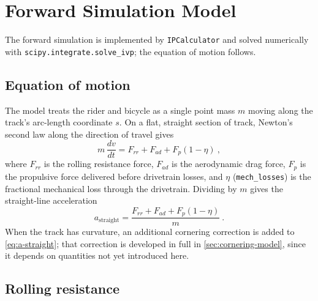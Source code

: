 \section{Forward Simulation Model}
\label{sec:simulation-model}

The forward simulation is implemented by \nolinkurl{IPCalculator} and solved
numerically with \nolinkurl{scipy.integrate.solve_ivp}; the equation of motion
follows.

\subsection{Equation of motion}
\label{sec:eom}

The model treats the rider and bicycle as a single point mass $m$ moving along
the track's arc-length coordinate $s$. On a flat, straight section of track,
Newton's second law along the direction of travel gives
\begin{equation}
    m\,\frac{dv}{dt} = F_{rr} + F_{ad} + F_p (1 - \eta)\ ,
    \label{eq:newton-second-law}
\end{equation}
where $F_{rr}$ is the rolling resistance force, $F_{ad}$ is the aerodynamic drag
force, $F_p$ is the propulsive force delivered before drivetrain losses, and
$\eta$ (\nolinkurl{mech_losses}) is the fractional mechanical loss through the
drivetrain. Dividing by $m$ gives the straight-line acceleration
\begin{equation}
    a_{\mathrm{straight}} = \frac{F_{rr} + F_{ad} + F_p (1-\eta)}{m}\ .
    \label{eq:a-straight}
\end{equation}
When the track has curvature, an additional cornering correction is added to
\cref{eq:a-straight}; that correction is developed in full in
\cref{sec:cornering-model}, since it depends on quantities not yet introduced
here.

\subsection{Rolling resistance}
\label{sec:rolling-resistance}

